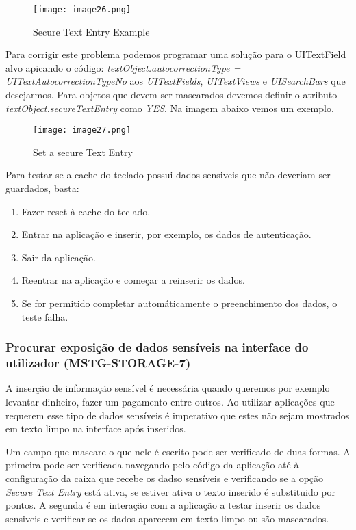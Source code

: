 \begin{figure}[H]
\centering
\texttt{[image: image26.png]}
\caption {Secure Text Entry Example}
\label {fig02}
\end{figure}



Para corrigir este problema podemos programar uma solução para o UITextField alvo apicando o código: \textit{textObject.autocorrectionType = UITextAutocorrectionTypeNo} aos \textit{UITextFields}, \textit{UITextViews} e \textit{UISearchBars} que desejarmos. Para objetos que devem ser mascarados devemos definir o atributo \textit{textObject.secureTextEntry} como \textit{YES}.  Na imagem abaixo vemos um exemplo.
	 
\begin{figure}[H]
\centering
\texttt{[image: image27.png]}
\caption {Set a secure Text Entry}
\label {fig02}
\end{figure}

Para testar se a cache do teclado possui dados sensiveis que não deveriam ser guardados, basta:
\begin{enumerate}
	\item Fazer reset à cache do teclado.
	\item Entrar na aplicação e inserir, por exemplo, os dados de autenticação.
	\item Sair da aplicação.
	\item Reentrar na aplicação e começar a reinserir os dados. 
	\item Se for permitido completar automáticamente o preenchimento dos dados, o teste falha.
\end{enumerate}



\subsubsection{Procurar exposição de dados sensíveis na interface do utilizador (MSTG-STORAGE-7)}
\hfill\par
\hfill\par


A inserção de informação sensível é necessária quando queremos por exemplo levantar dinheiro, fazer um pagamento entre outros. Ao utilizar aplicações que requerem esse tipo de dados sensíveis é imperativo que estes não sejam mostrados em texto limpo na interface após inseridos.\par
\hfill\par
Um campo que mascare o que nele é escrito pode ser verificado de duas formas.
A primeira pode ser verificada navegando pelo código da aplicação até à configuração da caixa que recebe os dadso sensíveis e verificando se a opção \textit{Secure Text Entry} está ativa, se estiver ativa o texto inserido é substituido por pontos.
A segunda é em interação com a aplicação a testar inserir os dados sensiveis e verificar se os dados aparecem em texto limpo ou são mascarados.



